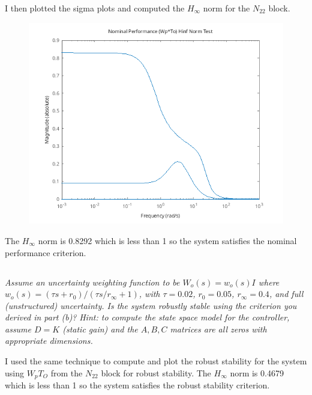 \documentclass{article}
\begin{document}
I then plotted the sigma plots and computed the $H_\infty$ norm for the $N_{22}$ block.

\begin{figure}[H]
    \centering
    \includegraphics[width=\textwidth]{1performance.png}
    \label{fig:1performance}
\end{figure}

The $H_\infty$ norm is 0.8292 which is less than 1 so the system satisfies the nominal performance criterion.

\subsection{} 
\textit{Assume an uncertainty weighting function to be $W_o(s) = w_o(s) I$ where $w_o(s) = (\tau s + r_0)/(\tau s / r_{\infty} + 1)$, with $\tau = 0.02$, $r_0 = 0.05$, $r_{\infty} = 0.4$, and full (unstructured) uncertainty. Is the system robustly stable using the criterion you derived in part (b)?}
\textit{Hint: to compute the state space model for the controller, assume $D = K$ (static gain) and the $A, B, C$ matrices are all zeros with appropriate dimensions.}

I used the same technique to compute and plot the robust stability for the system using $W_p T_O$ from the $N_{22}$ block for robust stability.
The $H_\infty$ norm is 0.4679 which is less than 1 so the system satisfies the robust stability criterion.
\end{document}
